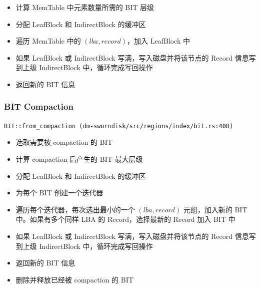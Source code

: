 \begin{itemize}[itemsep=2pt,topsep=0pt,parsep=0pt]
  \item 计算 MemTable 中元素数量所需的 BIT 层级
  \item 分配 LeafBlock 和 IndirectBlock 的缓冲区
  \item 遍历 MemTable 中的 $(lba, record)$，加入 LeafBlock 中
  \item 如果 LeafBlock 或 IndirectBlock 写满，写入磁盘并将该节点的 Record 信息写到上级 IndirectBlock 中，循环完成写回操作
  \item 返回新的 BIT 信息
\end{itemize}

\subsubsection{BIT Compaction}

\texttt{BIT::from_compaction (dm-sworndisk/src/regions/index/bit.rs:408)}

\begin{itemize}[itemsep=2pt,topsep=0pt,parsep=0pt]
  \item 选取需要被 compaction 的 BIT
  \item 计算 compaction 后产生的 BIT 最大层级
  \item 分配 LeafBlock 和 IndirectBlock 的缓冲区
  \item 为每个 BIT 创建一个迭代器
  \item 遍历每个迭代器，每次选出最小的一个 $(lba, record)$ 元组，加入新的 BIT 中。如果有多个同样 LBA 的 Record，选择最新的 Record 加入 BIT 中
  \item 如果 LeafBlock 或 IndirectBlock 写满，写入磁盘并将该节点的 Record 信息写到上级 IndirectBlock 中，循环完成写回操作
  \item 返回新的 BIT 信息
  \item 删除并释放已经被 compaction 的 BIT
\end{itemize}
